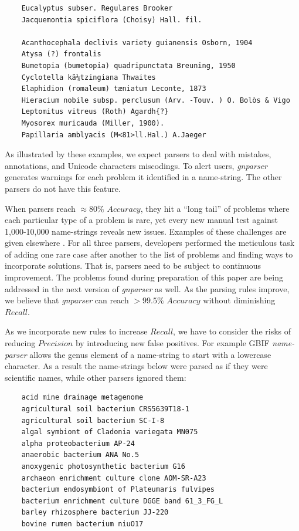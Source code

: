 \documentclass{bmcart}
\begin{document}
\vspace{0.5cm}

\begin{verbatim}
    Eucalyptus subser. Regulares Brooker
    Jacquemontia spiciflora (Choisy) Hall. fil.

    Acanthocephala declivis variety guianensis Osborn, 1904
    Atysa (?) frontalis
    Bumetopia (bumetopia) quadripunctata Breuning, 1950
    Cyclotella kã¼tzingiana Thwaites
    Elaphidion (romaleum) tæniatum Leconte, 1873
    Hieracium nobile subsp. perclusum (Arv. -Touv. ) O. Bolòs & Vigo
    Leptomitus vitreus (Roth) Agardh{?}
    Myosorex muricauda (Miller, 1900).
    Papillaria amblyacis (M<81>ll.Hal.) A.Jaeger
\end{verbatim}

\vspace{0.5cm}

As illustrated by these examples, we expect parsers to deal with mistakes,
annotations, and Unicode characters miscodings. To alert users,
\textit{gnparser} generates warnings for each problem it identified in a
name-string. The other parsers do not have this feature.

When parsers reach $\approx80\%$ $Accuracy$, they hit a ``long tail'' of
problems where each particular type of a problem is rare, yet every new manual
test against 1,000-10,000 name-strings reveals new issues.  Examples of these
challenges are given elsewhere \cite{Patterson:inpress-a}. For all three
parsers, developers performed the meticulous task of adding one rare case after
another to the list of problems and finding ways to incorporate solutions. That
is, parsers need to be subject to continuous improvement. The problems found
during preparation of this paper are being addressed in the next version of
\textit{gnparser} as well. As the parsing rules improve, we believe that
\textit{gnparser} can reach $>99.5\%$ $Accuracy$ without diminishing $Recall$.

As we incorporate new rules to increase $Recall$, we have to consider the risks
of reducing $Precision$ by introducing new false positives. For example GBIF
\textit{name-parser} allows the genus element of a name-string to start with a
lowercase character. As a result the name-strings below were parsed as if they
were scientific names, while other parsers ignored them:

\vspace{0.5cm}

\begin{verbatim}
    acid mine drainage metagenome
    agricultural soil bacterium CRS5639T18-1
    agricultural soil bacterium SC-I-8
    algal symbiont of Cladonia variegata MN075
    alpha proteobacterium AP-24
    anaerobic bacterium ANA No.5
    anoxygenic photosynthetic bacterium G16
    archaeon enrichment culture clone AOM-SR-A23
    bacterium endosymbiont of Plateumaris fulvipes
    bacterium enrichment culture DGGE band 61_3_FG_L
    barley rhizosphere bacterium JJ-220
    bovine rumen bacterium niuO17
\end{verbatim}
\end{document}
